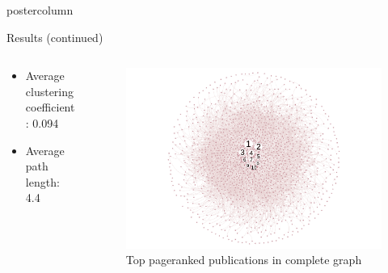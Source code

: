 \documentclass[final,hyperref={pdfpagelabels=false}]{beamer}
\begin{document}
\begin{frame}
\begin{columns}
\begin{column}{.5\textwidth}
\begin{beamercolorbox}[center,wd=\textwidth]{postercolumn}
\begin{minipage}[T]{.96\textwidth}
{\begin{block}{Results (continued)}
\begin{center}
\begin{columns}
\begin{column}{.40\linewidth}
\begin{center}
\begin{itemize}
\begin{itemize}
				\item Average clustering coefficient: 0.094
				\item Average path length: 4.4
			\end{itemize}				
                \end{itemize}
                \end{center}
              \end{column}              
              \begin{column}{.59\linewidth}
              \vspace{0pt}
                  \begin{figure}
                      \begin{center}
                          \includegraphics[width=.8\linewidth]{top_pagerank_graph2.pdf}
                      \end{center}
                      \caption{\label{fig:citation_graph}Top pageranked publications in complete graph}
                   \end{figure}       
              \end{column}
              \end{columns}
                   
            
                \end{center}


\end{block}}
\end{minipage}
\end{beamercolorbox}
\end{column}
\end{columns}
\end{frame}
\end{document}
